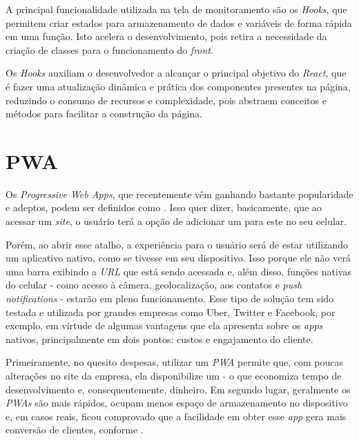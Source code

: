 A principal funcionalidade utilizada na tela de monitoramento são os \textit{Hooks}, que permitem criar estados para armazenamento de dados e variáveis de forma rápida em uma função. Isto acelera o desenvolvimento, pois retira a necessidade da criação de classes para o funcionamento do \textit{front}.

Os \textit{Hooks} auxiliam o desenvolvedor a alcançar o principal objetivo do \textit{React}, que é fazer uma atualização dinâmica e prática dos componentes presentes na página, reduzindo o consumo de recursos e complexidade, pois abstraem conceitos e métodos para facilitar a construção da página.

\section{PWA}
\label{sec:pwa}

Os \textit{Progressive Web Apps}, que recentemente vêm ganhando bastante popularidade e adeptos, podem ser definidos como \cite{Souza19} . Isso quer dizer, basicamente, que ao acessar um \textit{site}, o usuário terá a opção de adicionar um  para este no seu celular.

Porém, ao abrir esse atalho, a experiência para o usuário será de estar utilizando um aplicativo nativo, como se tivesse  em seu dispositivo. Isso porque ele não verá uma barra exibindo a \textit{URL} que está sendo acessada e, além disso, funções nativas do celular - como acesso à câmera, geolocalização, aos contatos e \textit{push notifications} - estarão em pleno funcionamento. Esse tipo de solução tem sido testada e utilizada por grandes empresas como Uber, Twitter e Facebook, por exemplo, em virtude de algumas vantagens que ela apresenta sobre os \textit{apps} nativos, principalmente em dois pontos: custos e engajamento do cliente.


Primeiramente, no quesito despesas, utilizar um \textit{PWA} permite que, com poucas alterações no site da empresa, ela disponibilize um  - o que economiza tempo de desenvolvimento e, consequentemente, dinheiro. Em segundo lugar, geralmente os \textit{PWAs} são mais rápidos, ocupam menos espaço de armazenamento no dispositivo e, em casos reais, ficou comprovado que a facilidade em obter esse \textit{app} gera mais conversão de clientes, conforme \cite{Souza19} .

